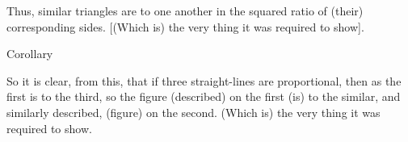\begin{Parallel}{}{}
{Thus, similar triangles are to one another in the squared
ratio of  (their) corresponding sides. [(Which is) the very thing it was required
to show].\\

\begin{center}
{\large Corollary}
\end{center}\vspace*{-7pt}

So it is clear, from this, that if three straight-lines are proportional, then
as the first is to the third, so  the figure (described) on the first (is) to the similar,
and similarly described, (figure) on the second. (Which is) the very thing it
was required to show.}
\end{Parallel}


\vspace{7pt}{\footnotesize\noindent$^\dag$ Literally, ``double''.}

